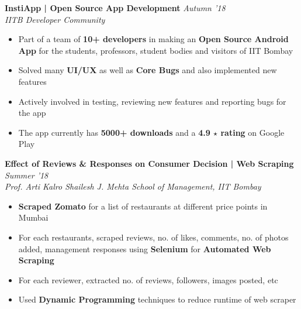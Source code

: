 \documentclass[11pt]{article}%
\begin{document}
{\flushleft \bf \large{InstiApp | Open Source App Development}}   \hfill {{\em{Autumn '18} }}\\
{\em{IITB Developer Community}}
\begin{itemize}
\vspace{-2mm}
\setlength\itemsep{0.01em}
\item Part of a team of {\bf 10+ developers} in making an {\bf Open Source Android App} for the students, professors, student bodies and visitors of IIT Bombay
\vspace{-1.2mm}
\item Solved many {\bf UI/UX} as well as {\bf Core Bugs} and also implemented new features
\vspace{-1.2mm}
\item Actively involved in testing, reviewing new features and reporting bugs for the app
\vspace{-1.2mm}
\item The app currently has {\bf 5000+ downloads} and a {\bf 4.9 $\star$ rating} on Google Play
\end{itemize}
\vspace{-0.5cm}

{\flushleft \bf \large{Effect of Reviews \& Responses on Consumer Decision | Web Scraping}} \hfill {{{\em{Summer '18}}}} \\
{\em{Prof. Arti Kalro \textbar Shailesh J. Mehta School of Management, IIT Bombay}}
\vspace{-1mm}
\begin{itemize}
\setlength\itemsep{0.01em}
\vspace{-1mm}
\item {\bf Scraped Zomato} for a list of restaurants at different price points in Mumbai
\vspace{-1mm}
\item For each restaurants, scraped reviews, no. of likes, comments, no. of photos added, management responses using {\bf Selenium} for {\bf Automated Web Scraping}
\vspace{-1mm}
\item For each reviewer, extracted no. of reviews, followers, images posted, etc
\vspace{-1mm}
\item Used {\bf Dynamic Programming} techniques to reduce runtime of web scraper
\end{itemize}
\vspace{-0.5cm}
\end{document}
